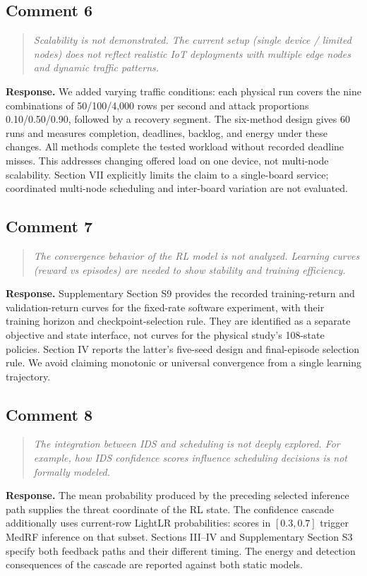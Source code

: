 \documentclass[11pt,a4paper]{article}
\newenvironment{comment}{\begin{quote}\small\itshape}{\end{quote}}
\newcommand{\response}{\noindent\textbf{Response.} }
\begin{document}
\subsection*{Comment 6}
\begin{comment}
Scalability is not demonstrated. The current setup (single device / limited nodes) does not reflect realistic IoT deployments with multiple edge nodes and dynamic traffic patterns.
\end{comment}
\response We added varying traffic conditions: each physical run covers the nine combinations of 50/100/4,000 rows per second and attack proportions 0.10/0.50/0.90, followed by a recovery segment. The six-method design gives 60 runs and measures completion, deadlines, backlog, and energy under these changes. All methods complete the tested workload without recorded deadline misses. This addresses changing offered load on one device, not multi-node scalability. Section VII explicitly limits the claim to a single-board service; coordinated multi-node scheduling and inter-board variation are not evaluated.

\subsection*{Comment 7}
\begin{comment}
The convergence behavior of the RL model is not analyzed. Learning curves (reward vs episodes) are needed to show stability and training efficiency.
\end{comment}
\response Supplementary Section S9 provides the recorded training-return and validation-return curves for the fixed-rate software experiment, with their training horizon and checkpoint-selection rule. They are identified as a separate objective and state interface, not curves for the physical study's 108-state policies. Section IV reports the latter's five-seed design and final-episode selection rule. We avoid claiming monotonic or universal convergence from a single learning trajectory.

\subsection*{Comment 8}
\begin{comment}
The integration between IDS and scheduling is not deeply explored. For example, how IDS confidence scores influence scheduling decisions is not formally modeled.
\end{comment}
\response The mean probability produced by the preceding selected inference path supplies the threat coordinate of the RL state. The confidence cascade additionally uses current-row LightLR probabilities: scores in $[0.3,0.7]$ trigger MedRF inference on that subset. Sections III--IV and Supplementary Section S3 specify both feedback paths and their different timing. The energy and detection consequences of the cascade are reported against both static models.
\end{document}
